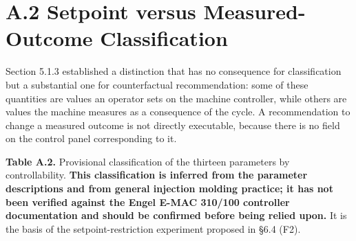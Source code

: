 \hypertarget{a.2-setpoint-versus-measured-outcome-classification}{%
\section{A.2 Setpoint versus Measured-Outcome Classification}\label{a.2-setpoint-versus-measured-outcome-classification}}

Section 5.1.3 established a distinction that has no consequence for classification but a substantial one for counterfactual recommendation: some of these quantities are values an operator sets on the machine controller, while others are values the machine measures as a consequence of the cycle. A recommendation to change a measured outcome is not directly executable, because there is no field on the control panel corresponding to it.

\textbf{Table A.2.} Provisional classification of the thirteen parameters by controllability. \textbf{This classification is inferred from the parameter descriptions and from general injection molding practice; it has not been verified against the Engel E-MAC 310/100 controller documentation and should be confirmed before being relied upon.} It is the basis of the setpoint-restriction experiment proposed in §6.4 (F2).

